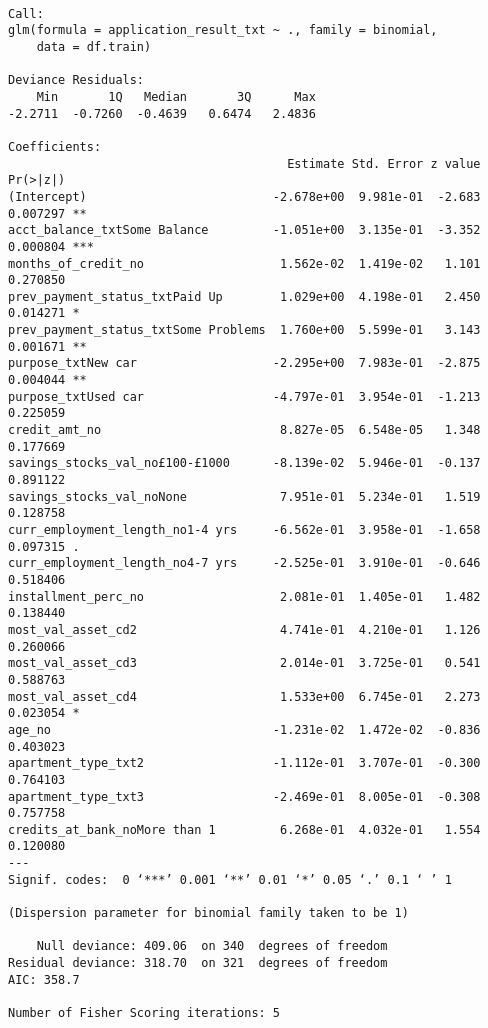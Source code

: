 \documentclass[11pt]{article}
\begin{document}
    
    \begin{verbatim}

Call:
glm(formula = application_result_txt ~ ., family = binomial, 
    data = df.train)

Deviance Residuals: 
    Min       1Q   Median       3Q      Max  
-2.2711  -0.7260  -0.4639   0.6474   2.4836  

Coefficients:
                                       Estimate Std. Error z value Pr(>|z|)    
(Intercept)                          -2.678e+00  9.981e-01  -2.683 0.007297 ** 
acct_balance_txtSome Balance         -1.051e+00  3.135e-01  -3.352 0.000804 ***
months_of_credit_no                   1.562e-02  1.419e-02   1.101 0.270850    
prev_payment_status_txtPaid Up        1.029e+00  4.198e-01   2.450 0.014271 *  
prev_payment_status_txtSome Problems  1.760e+00  5.599e-01   3.143 0.001671 ** 
purpose_txtNew car                   -2.295e+00  7.983e-01  -2.875 0.004044 ** 
purpose_txtUsed car                  -4.797e-01  3.954e-01  -1.213 0.225059    
credit_amt_no                         8.827e-05  6.548e-05   1.348 0.177669    
savings_stocks_val_no£100-£1000      -8.139e-02  5.946e-01  -0.137 0.891122    
savings_stocks_val_noNone             7.951e-01  5.234e-01   1.519 0.128758    
curr_employment_length_no1-4 yrs     -6.562e-01  3.958e-01  -1.658 0.097315 .  
curr_employment_length_no4-7 yrs     -2.525e-01  3.910e-01  -0.646 0.518406    
installment_perc_no                   2.081e-01  1.405e-01   1.482 0.138440    
most_val_asset_cd2                    4.741e-01  4.210e-01   1.126 0.260066    
most_val_asset_cd3                    2.014e-01  3.725e-01   0.541 0.588763    
most_val_asset_cd4                    1.533e+00  6.745e-01   2.273 0.023054 *  
age_no                               -1.231e-02  1.472e-02  -0.836 0.403023    
apartment_type_txt2                  -1.112e-01  3.707e-01  -0.300 0.764103    
apartment_type_txt3                  -2.469e-01  8.005e-01  -0.308 0.757758    
credits_at_bank_noMore than 1         6.268e-01  4.032e-01   1.554 0.120080    
---
Signif. codes:  0 ‘***’ 0.001 ‘**’ 0.01 ‘*’ 0.05 ‘.’ 0.1 ‘ ’ 1

(Dispersion parameter for binomial family taken to be 1)

    Null deviance: 409.06  on 340  degrees of freedom
Residual deviance: 318.70  on 321  degrees of freedom
AIC: 358.7

Number of Fisher Scoring iterations: 5

    \end{verbatim}
\end{document}
